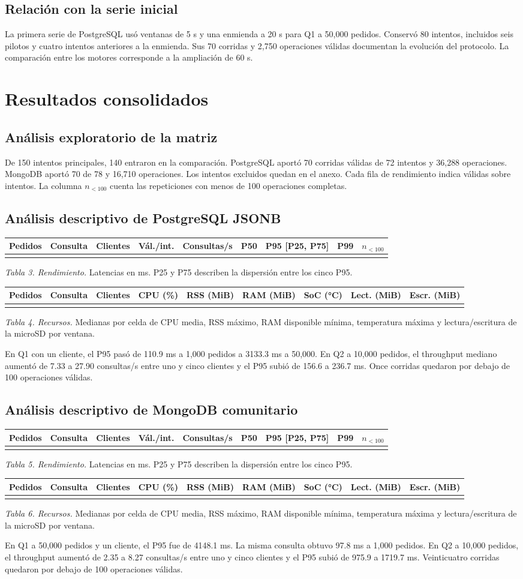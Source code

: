 \documentclass[10pt,a4paper]{article}
\makeatletter
\newcommand{\tablaMotor}[4]{%
\begin{center}
\small
\begin{tabular}{@{}rlrrrrrrr@{}}
\toprule
Pedidos & Consulta & Clientes & Vál./int. & Consultas/s & P50 & P95 [P25, P75] & P99 & $n_{<100}$\\
\midrule
#1
\bottomrule
\end{tabular}
\par\smallskip
\textit{Tabla #3. Rendimiento.} Latencias en ms. P25 y P75 describen la dispersión entre los cinco P95.
\par\medskip
\begin{tabular}{@{}rlrrrrrrr@{}}
\toprule
Pedidos & Consulta & Clientes & CPU (\%) & RSS (MiB) & RAM (MiB) & SoC (°C) & Lect. (MiB) & Escr. (MiB)\\
\midrule
#2
\bottomrule
\end{tabular}
\par\smallskip
\textit{Tabla #4. Recursos.} Medianas por celda de CPU media, RSS máximo, RAM disponible mínima, temperatura máxima y lectura/escritura de la microSD por ventana.
\end{center}
}
\makeatother
\begin{document}
\subsection{Relación con la serie inicial}
La primera serie de PostgreSQL usó ventanas de 5 s y una enmienda a 20 s para Q1 a 50,000 pedidos. Conservó 80 intentos, incluidos seis pilotos y cuatro intentos anteriores a la enmienda. Sus 70 corridas y 2,750 operaciones válidas documentan la evolución del protocolo. La comparación entre los motores corresponde a la ampliación de 60 s.

\clearpage
\section{Resultados consolidados}
\subsection{Análisis exploratorio de la matriz}
De 150 intentos principales, 140 entraron en la comparación. PostgreSQL aportó 70 corridas válidas de 72 intentos y 36,288 operaciones. MongoDB aportó 70 de 78 y 16,710 operaciones. Los intentos excluidos quedan en el anexo. Cada fila de rendimiento indica válidas sobre intentos. La columna $n_{<100}$ cuenta las repeticiones con menos de 100 operaciones completas.

\subsection{Análisis descriptivo de PostgreSQL JSONB}
\tablaMotor{\PgPerformance}{\PgResources}{3}{4}
En Q1 con un cliente, el P95 pasó de 110.9 ms a 1,000 pedidos a 3133.3 ms a 50,000. En Q2 a 10,000 pedidos, el throughput mediano aumentó de 7.33 a 27.90 consultas/s entre uno y cinco clientes y el P95 subió de 156.6 a 236.7 ms. Once corridas quedaron por debajo de 100 operaciones válidas.

\clearpage
\subsection{Análisis descriptivo de MongoDB comunitario}
\tablaMotor{\MongoPerformance}{\MongoResources}{5}{6}
En Q1 a 50,000 pedidos y un cliente, el P95 fue de 4148.1 ms. La misma consulta obtuvo 97.8 ms a 1,000 pedidos. En Q2 a 10,000 pedidos, el throughput aumentó de 2.35 a 8.27 consultas/s entre uno y cinco clientes y el P95 subió de 975.9 a 1719.7 ms. Veinticuatro corridas quedaron por debajo de 100 operaciones válidas.
\end{document}
